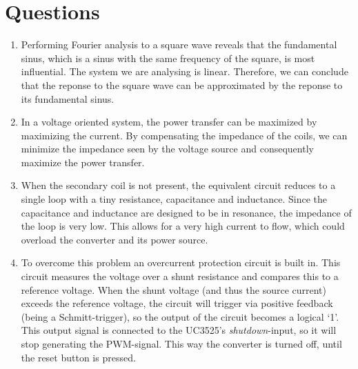 \documentclass[11pt,titlepage]{report}
\begin{document}
\section{Questions}
\begin{enumerate}
\item
Performing Fourier analysis to a square wave reveals that the fundamental sinus, which is a sinus with the same frequency of the square, is most influential. The system we are analysing is linear. Therefore, we can conclude that the reponse to the square wave can be approximated by the reponse to its fundamental sinus.

\item
In a voltage oriented system, the power transfer can be maximized by maximizing the current. By compensating the impedance of the coils, we can minimize the impedance seen by the voltage source and consequently maximize the power transfer.

\item
When the secondary coil is not present, the equivalent circuit reduces to a single loop with a tiny resistance, capacitance and inductance. Since the capacitance and inductance are designed to be in resonance, the impedance of the loop is very low. This allows for a very high current to flow, which could overload the converter and its power source.

\item
To overcome this problem an overcurrent protection circuit is built in. This circuit measures the voltage over a shunt resistance and compares this to a reference voltage. When the shunt voltage (and thus the source current) exceeds the reference voltage, the circuit will trigger via positive feedback (being a Schmitt-trigger), so the output of the circuit becomes a logical `1'. This output signal is connected to the UC3525's \textit{shutdown}-input, so it will stop generating the PWM-signal. This way the converter is turned off, until the reset button is pressed.
\end{enumerate}
\end{document}
